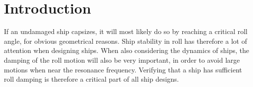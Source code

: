 \section{Introduction}
\label{se:introduction}
If an undamaged ship capsizes, it will most likely do so by reaching a critical roll angle, for obvious geometrical reasons. Ship stability in roll has therefore a lot of attention when designing ships. When also considering the dynamics of ships, the damping of the roll motion will also be very important, in order to avoid large motions when near the resonance frequency. Verifying that a ship has sufficient roll damping is therefore a critical part of all ship designs. 